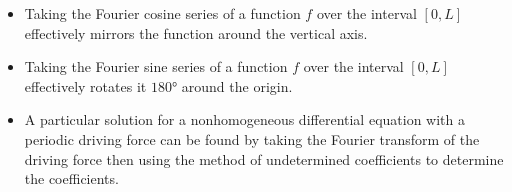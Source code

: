 \documentclass{article}
\begin{document}
\begin{itemize}
  \item Taking the Fourier cosine series of a function $f$ over the interval $[0, L]$ effectively mirrors the function around the vertical axis.

  \item Taking the Fourier sine series of a function $f$ over the interval $[0, L]$ effectively rotates it $\ang{180}$ around the origin.

  \item A particular solution for a nonhomogeneous differential equation with a periodic driving force can be found by taking the Fourier transform of the driving force then using the method of undetermined coefficients to determine the coefficients.
\end{itemize}
\end{document}
